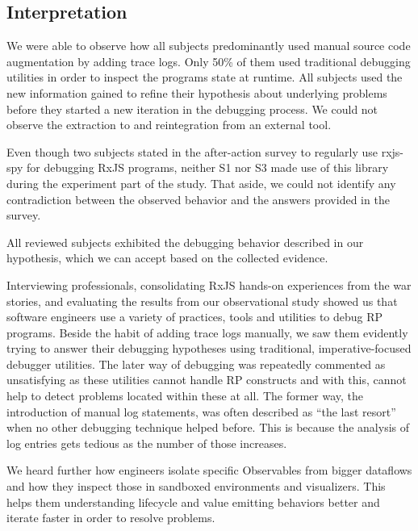 \documentclass[12pt,a4paper]{article}
\begin{document}
\subsection{Interpretation}

We were able to observe how all subjects predominantly used manual source code augmentation by adding trace logs. Only 50\% of them used traditional debugging utilities in order to inspect the programs state at runtime. All subjects used the new information gained to refine their hypothesis about underlying problems before they started a new iteration in the debugging process. We could not observe the extraction to and reintegration from an external tool.

Even though two subjects stated in the after-action survey to regularly use rxjs-spy for debugging RxJS programs, neither S1 nor S3 made use of this library during the experiment part of the study. That aside, we could not identify any contradiction between the observed behavior and the answers provided in the survey.

All reviewed subjects exhibited the debugging behavior described in our hypothesis, which we can accept based on the collected evidence.

Interviewing professionals, consolidating RxJS hands-on experiences from the war stories, and evaluating the results from our observational study showed us that software engineers use a variety of practices, tools and utilities to debug RP programs. Beside the habit of adding trace logs manually, we saw them evidently trying to answer their debugging hypotheses using traditional, imperative-focused debugger utilities. The later way of debugging was repeatedly commented as unsatisfying as these utilities cannot handle RP constructs and with this, cannot help to detect problems located within these at all. The former way, the introduction of manual log statements, was often described as ``the last resort'' when no other debugging technique helped before. This is because the analysis of log entries gets tedious as the number of those increases.

We heard further how engineers isolate specific Observables from bigger dataflows and how they inspect those in sandboxed environments and visualizers. This helps them understanding lifecycle and value emitting behaviors better and iterate faster in order to resolve problems.
\end{document}
